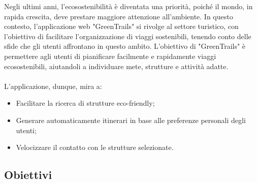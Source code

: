 \documentclass{CSUniSchoolLabReport}
\begin{document}
Negli ultimi anni, l'ecosostenibilità è diventata una priorità, poiché il mondo, in rapida crescita, deve prestare maggiore attenzione all'ambiente. In questo contesto, l'applicazione web "GreenTrails" si rivolge al settore turistico, con l'obiettivo di facilitare l'organizzazione di viaggi sostenibili, tenendo conto delle sfide che gli utenti affrontano in questo ambito.
L'obiettivo di "GreenTrails" è permettere agli utenti di pianificare facilmente e rapidamente viaggi ecosostenibili, aiutandoli a individuare mete, strutture e attività adatte. \\\\
L'applicazione, dunque, mira a:
\begin{itemize}
    \item Facilitare la ricerca di strutture eco-friendly;
    \item Generare automaticamente itinerari in base alle preferenze personali degli utenti;
    \item Velocizzare il contatto con le strutture selezionate.
\end{itemize}


\subsection{Obiettivi}
\end{document}
